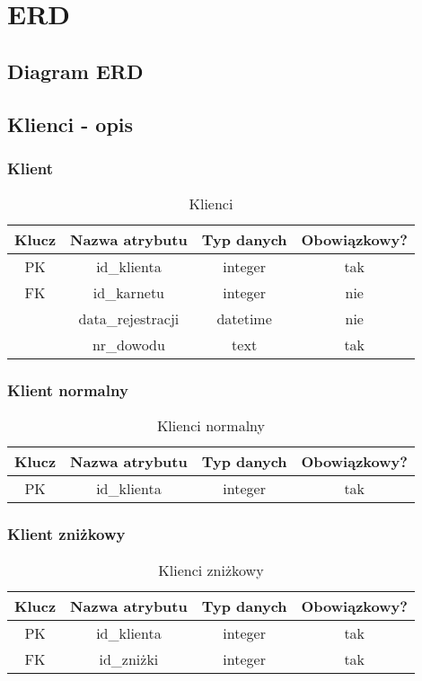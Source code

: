 \newpage
\section{ERD}
\subsection{Diagram ERD}
\begin{figure}
	
\end{figure}

\newpage
\subsection{Klienci - opis}
\subsubsection{Klient}
\begin{table}[H]
	\centering
	\begin{tabular}{|c|c|c|c|}
		\hline
		Klucz & Nazwa atrybutu    & Typ danych & Obowiązkowy? \\ \hline
		PK    & id\_klienta       & integer    & tak           \\ \hline
		FK    & id\_karnetu       & integer    & nie           \\ \hline
		      & data\_rejestracji & datetime   & nie           \\ \hline
		      & nr\_dowodu        & text       & tak           \\ \hline
	\end{tabular}
	\caption{Klienci}
\end{table}

\subsubsection{Klient normalny}
\begin{table}[H]
	\centering
	\begin{tabular}{|c|c|c|c|}
		\hline
		Klucz & Nazwa atrybutu & Typ danych & Obowiązkowy? \\ \hline
		PK    & id\_klienta    & integer    & tak           \\ \hline
	\end{tabular}
	\caption{Klienci normalny}
\end{table}

\subsubsection{Klient zniżkowy}
\begin{table}[H]
	\centering
	\begin{tabular}{|c|c|c|c|}
		\hline
		Klucz & Nazwa atrybutu & Typ danych & Obowiązkowy? \\ \hline
		PK    & id\_klienta    & integer    & tak           \\ \hline
		FK    & id\_zniżki    & integer    & tak           \\ \hline
	\end{tabular}
	\caption{Klienci zniżkowy}
\end{table}

